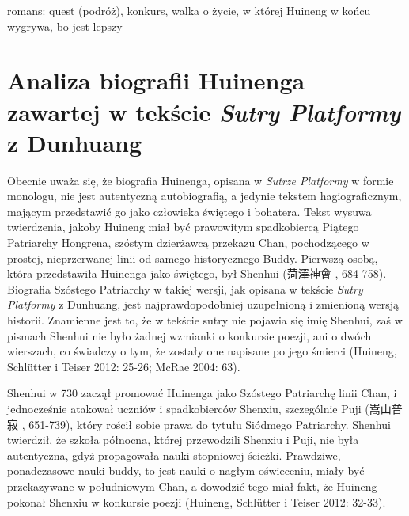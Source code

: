 romans: quest (podróż), konkurs, walka o życie, w której Huineng w końcu wygrywa, bo jest lepszy

\fi

\section{Analiza biografii Huinenga zawartej w tekście \textit{Sutry Platformy} z Dunhuang}
Obecnie uważa się, że biografia Huinenga, opisana w \textit{Sutrze Platformy} w formie monologu, nie jest autentyczną autobiografią, a jedynie tekstem hagiograficznym, mającym przedstawić go jako człowieka świętego i bohatera. Tekst wysuwa twierdzenia, jakoby Huineng miał być prawowitym spadkobiercą Piątego Patriarchy Hongrena, szóstym dzierżawcą przekazu Chan, pochodzącego w prostej, nieprzerwanej linii od samego historycznego Buddy. Pierwszą osobą, która przedstawiła Huinenga jako świętego, był Shenhui (菏澤神會 , 684-758). Biografia Szóstego Patriarchy w takiej wersji, jak opisana w tekście \textit{Sutry Platformy} z Dunhuang, jest najprawdopodobniej uzupełnioną i zmienioną wersją historii. Znamienne jest to, że w tekście sutry nie pojawia się imię Shenhui, zaś w pismach Shenhui nie było żadnej wzmianki o konkursie poezji, ani o dwóch wierszach, co świadczy o tym, że zostały one napisane po jego śmierci (Huineng, Schlütter i Teiser 2012: 25-26; McRae 2004: 63).

Shenhui w 730 zaczął promować Huinenga jako Szóstego Patriarchę linii Chan, i jednocześnie atakował uczniów i spadkobierców Shenxiu, szczególnie Puji (嵩山普寂 , 651-739), który rościł sobie prawa do tytułu Siódmego Patriarchy. Shenhui twierdził, że szkoła północna, której przewodzili Shenxiu i Puji, nie była autentyczna, gdyż propagowała nauki stopniowej ścieżki. Prawdziwe, ponadczasowe nauki buddy, to jest nauki o nagłym oświeceniu, miały być przekazywane w południowym Chan, a dowodzić tego miał fakt, że Huineng pokonał Shenxiu w konkursie poezji (Huineng, Schlütter i Teiser 2012: 32-33).

